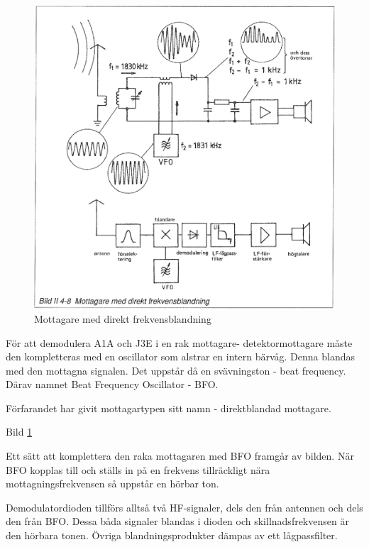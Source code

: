 \begin{figure}
  \includegraphics[width=\textwidth]{images/bild_2_4-08}
  \caption{Mottagare med direkt frekvensblandning}
  \label{fig:bildII4-8}
\end{figure}

För att demodulera A1A och J3E i en rak mottagare-
detektormottagare måste den kompletteras med en oscillator som alstrar
en intern bärvåg. Denna blandas med den mottagna signalen. Det uppstår
då en svävningston - beat frequency. Därav namnet Beat Frequency
Oscillator - BFO.

Förfarandet har givit mottagartypen sitt namn - direktblandad
mottagare.

Bild \ref{fig:bildII4-8}

Ett sätt att komplettera den raka mottagaren med BFO framgår av
bilden. När BFO kopplas till och ställs in på en frekvens tillräckligt
nära mottagningsfrekvensen så uppstår en hörbar ton.

Demodulatordioden tillförs alltså två HF-signaler, dels den från
antennen och dels den från BFO. Dessa båda signaler blandas i dioden
och skillnadsfrekvensen är den hörbara tonen. Övriga
blandningsprodukter dämpas av ett lågpassfilter.

